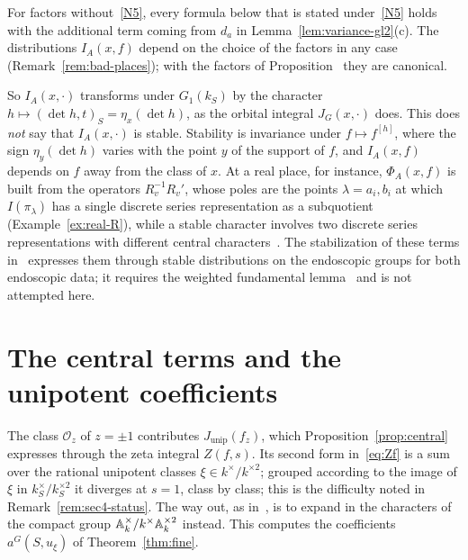 \begin{remarkrev}
For factors without~\ref{N5}, every formula below that is stated
under~\ref{N5} holds with the additional term coming from $d_a$ in
Lemma~\ref{lem:variance-gl2}(c). The distributions $I_A(x,f)$ depend on
the choice of the factors in any case (Remark~\ref{rem:bad-places}); with
the factors of Proposition~\normref{} they are canonical.
\end{remarkrev}

So $I_A(x,\cdot)$ transforms under $G_1(k_S)$ by the character
$h\mapsto(\det h,t)_S=\eta_x(\det h)$, as the orbital integral
$J_G(x,\cdot)$ does. This does \emph{not} say that $I_A(x,\cdot)$ is
stable. Stability is invariance under $f\mapsto f^{[h]}$, where the sign
$\eta_y(\det h)$ varies with the point $y$ of the support of $f$, and
$I_A(x,f)$ depends on $f$ away from the class of $x$. At a real place, for instance, $\Phi_A(x,f)$ is built from the operators
$R_v^{-1}R_v'$, whose poles are the points $\lambda=a_i,b_i$ at which
$I(\pi_\lambda)$ has a single discrete series representation as a
subquotient (Example~\ref{ex:real-R}), while a stable character involves
two discrete series representations with different central
characters~\cite{Ad98}. The stabilization of these terms in~\cite{Li21}
expresses them through stable distributions on the endoscopic groups for
both endoscopic data; it requires the weighted fundamental
lemma~\cite{Li12b} and is not attempted here.

\section{The central terms and the unipotent coefficients}
\label{sec:unipotent}

The class $\mathcal O_z$ of $z=\pm1$ contributes $J_{\mathrm{unip}}(f_z)$,
which Proposition~\ref{prop:central} expresses through the zeta integral
$Z(f,s)$. Its second form in~\eqref{eq:Zf} is a sum over the rational
unipotent classes $\xi\in k^\times/k^{\times2}$; grouped according to the
image of $\xi$ in $k_S^\times/k_S^{\times2}$ it diverges at $s=1$, class by
class; this is the difficulty noted in
Remark~\ref{rem:sec4-status}. The way out, as in~\cite{LL79}, is to expand
in the characters of the compact group $\mathbb{A}_k^\times/k^\times\mathbb{A}_k^{\times2}$
instead. This computes the coefficients $a^G(S,u_\xi)$ of
Theorem~\ref{thm:fine}.

